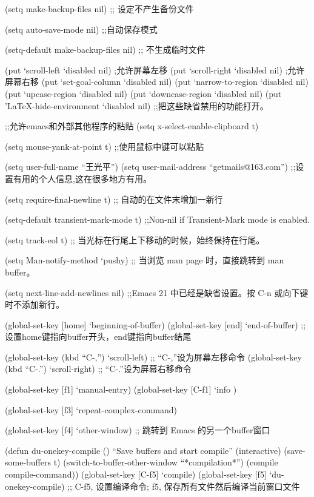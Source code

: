 \documentclass[11pt]{article}
\begin{document}
\begin{itemize}
(setq make-backup-files nil) 
;; 设定不产生备份文件

(setq auto-save-mode nil) 
;;自动保存模式

(setq-default make-backup-files nil)
;; 不生成临时文件

(put `scroll-left `disabled nil)     ;允许屏幕左移
(put `scroll-right `disabled nil)    ;允许屏幕右移
(put `set-goal-column `disabled nil)
(put `narrow-to-region `disabled nil) 
(put `upcase-region `disabled nil)
(put `downcase-region `disabled nil)
(put '\LaTeX{}-hide-environment `disabled nil)
;;把这些缺省禁用的功能打开。

;;允许emacs和外部其他程序的粘贴
(setq x-select-enable-clipboard t)

(setq mouse-yank-at-point t)
;;使用鼠标中键可以粘贴

(setq user-full-name ``王光平'')
(setq user-mail-address ``getmails@163.com'')
;;设置有用的个人信息,这在很多地方有用。

(setq require-final-newline t)
;; 自动的在文件末增加一新行

(setq-default transient-mark-mode t)
;;Non-nil if Transient-Mark mode is enabled.

(setq track-eol t)
;; 当光标在行尾上下移动的时候，始终保持在行尾。

(setq Man-notify-method `pushy)
;; 当浏览 man page 时，直接跳转到 man buffer。

(setq next-line-add-newlines nil)
;;Emacs 21 中已经是缺省设置。按 C-n 或向下键时不添加新行。
  
(global-set-key [home] `beginning-of-buffer)
(global-set-key [end] `end-of-buffer)
;;设置home键指向buffer开头，end键指向buffer结尾


(global-set-key (kbd ``C-,'') `scroll-left)
;; ``C-,''设为屏幕左移命令
(global-set-key (kbd ``C-.'') `scroll-right)
;; ``C-.''设为屏幕右移命令

(global-set-key [f1] `manual-entry)
(global-set-key [C-f1] `info )

(global-set-key [f3] `repeat-complex-command)

(global-set-key [f4] `other-window)
;; 跳转到 Emacs 的另一个buffer窗口

(defun du-onekey-compile ()
  ``Save buffers and start compile''
  (interactive)
  (save-some-buffers t)
  (switch-to-buffer-other-window ``*compilation*'')
  (compile compile-command))
  (global-set-key [C-f5] `compile)
  (global-set-key [f5] `du-onekey-compile)
;;  C-f5, 设置编译命令; f5, 保存所有文件然后编译当前窗口文件


\end{itemize}
\end{document}
